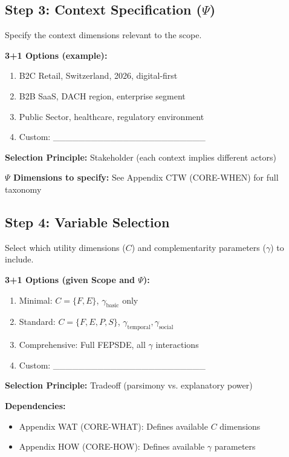 \subsection{Step 3: Context Specification ($\Psi$)}

Specify the context dimensions relevant to the scope.

\begin{tcolorbox}[colback=white, colframe=black,
    title=Step 3: Context Specification]
\textbf{3+1 Options (example):}
\begin{enumerate}
\item[$\square$] B2C Retail, Switzerland, 2026, digital-first
\item[$\square$] B2B SaaS, DACH region, enterprise segment
\item[$\square$] Public Sector, healthcare, regulatory environment
\item[$\square$] Custom: \_\_\_\_\_\_\_\_\_\_\_\_\_\_\_\_\_\_\_\_\_\_\_\_
\end{enumerate}

\textbf{Selection Principle:} Stakeholder (each context implies different actors)

\textbf{$\Psi$ Dimensions to specify:} See Appendix CTW (CORE-WHEN) for full taxonomy
\end{tcolorbox}

\subsection{Step 4: Variable Selection}

Select which utility dimensions ($C$) and complementarity parameters ($\gamma$) to include.

\begin{tcolorbox}[colback=white, colframe=black,
    title=Step 4: Variable Selection]
\textbf{3+1 Options (given Scope and $\Psi$):}
\begin{enumerate}
\item[$\square$] Minimal: $C = \{F, E\}$, $\gamma_{\text{basic}}$ only
\item[$\square$] Standard: $C = \{F, E, P, S\}$, $\gamma_{\text{temporal}}, \gamma_{\text{social}}$
\item[$\square$] Comprehensive: Full FEPSDE, all $\gamma$ interactions
\item[$\square$] Custom: \_\_\_\_\_\_\_\_\_\_\_\_\_\_\_\_\_\_\_\_\_\_\_\_
\end{enumerate}

\textbf{Selection Principle:} Tradeoff (parsimony vs. explanatory power)

\textbf{Dependencies:}
\begin{itemize}[nosep]
\item Appendix WAT (CORE-WHAT): Defines available $C$ dimensions
\item Appendix HOW (CORE-HOW): Defines available $\gamma$ parameters
\end{itemize}
\end{tcolorbox}

